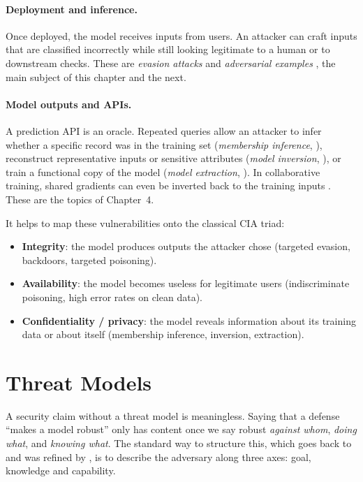 \documentclass[10pt,a4paper]{extarticle}
\theoremstyle{definition}
\begin{document}
\paragraph{Deployment and inference.} Once deployed, the model receives inputs from users. An attacker can craft inputs that are classified incorrectly while still looking legitimate to a human or to downstream checks. These are \emph{evasion attacks} and \emph{adversarial examples} \citep{biggio2013evasion,szegedy2014intriguing}, the main subject of this chapter and the next.

\paragraph{Model outputs and APIs.} A prediction API is an oracle. Repeated queries allow an attacker to infer whether a specific record was in the training set (\emph{membership inference}, \citealp{shokri2017membership}), reconstruct representative inputs or sensitive attributes (\emph{model inversion}, \citealp{fredrikson2015model}), or train a functional copy of the model (\emph{model extraction}, \citealp{tramer2016stealing}). In collaborative training, shared gradients can even be inverted back to the training inputs \citep{zhu2019deep}. These are the topics of Chapter~4.

\begin{keybox}
It helps to map these vulnerabilities onto the classical CIA triad:
\begin{itemize}
  \item \textbf{Integrity}: the model produces outputs the attacker chose (targeted evasion, backdoors, targeted poisoning).
  \item \textbf{Availability}: the model becomes useless for legitimate users (indiscriminate poisoning, high error rates on clean data).
  \item \textbf{Confidentiality / privacy}: the model reveals information about its training data or about itself (membership inference, inversion, extraction).
\end{itemize}
\end{keybox}

\section{Threat Models}

A security claim without a threat model is meaningless. Saying that a defense \enquote{makes a model robust} only has content once we say robust \emph{against whom}, \emph{doing what}, and \emph{knowing what}. The standard way to structure this, which goes back to \citet{barreno2006can} and was refined by \citet{biggio2018wild}, is to describe the adversary along three axes: goal, knowledge and capability.
\end{document}
